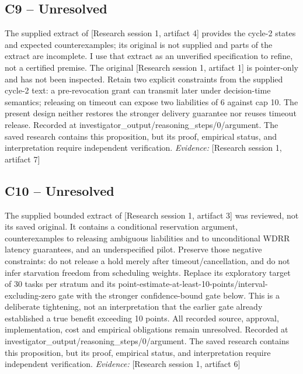 \documentclass[11pt]{article}
\begin{document}
\subsection{C9 -- Unresolved}
The supplied extract of [Research session 1, artifact 4] provides the cycle-2 states and expected counterexamples; its original is not supplied and parts of the extract are incomplete. I use that extract as an unverified specification to refine, not a certified premise. The original [Research session 1, artifact 1] is pointer-only and has not been inspected. Retain two explicit constraints from the supplied cycle-2 text: a pre-revocation grant can transmit later under decision-time semantics; releasing on timeout can expose two liabilities of 6 against cap 10. The present design neither restores the stronger delivery guarantee nor reuses timeout release.
Recorded at investigator\_output/reasoning\_steps/0/argument. The saved research contains this proposition, but its proof, empirical status, and interpretation require independent verification.
\textit{Evidence: }[Research session 1, artifact 7]
\subsection{C10 -- Unresolved}
The supplied bounded extract of [Research session 1, artifact 3] was reviewed, not its saved original. It contains a conditional reservation argument, counterexamples to releasing ambiguous liabilities and to unconditional WDRR latency guarantees, and an underspecified pilot. Preserve those negative constraints: do not release a hold merely after timeout/cancellation, and do not infer starvation freedom from scheduling weights. Replace its exploratory target of 30 tasks per stratum and its point-estimate-at-least-10-points/interval-excluding-zero gate with the stronger confidence-bound gate below. This is a deliberate tightening, not an interpretation that the earlier gate already established a true benefit exceeding 10 points. All recorded source, approval, implementation, cost and empirical obligations remain unresolved.
Recorded at investigator\_output/reasoning\_steps/0/argument. The saved research contains this proposition, but its proof, empirical status, and interpretation require independent verification.
\textit{Evidence: }[Research session 1, artifact 6]
\end{document}
